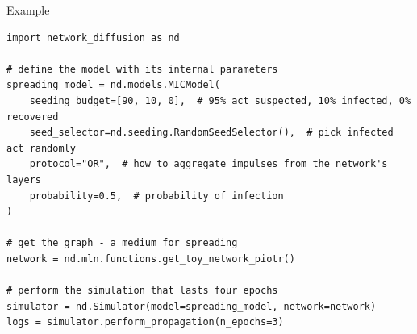 \documentclass[final]{beamer}
\newlength{\colwidth}
\begin{document}
\begin{frame}[t, fragile]
\begin{columns}[t]
\begin{column}{\colwidth}
\begin{alertblock}{Example}





\begin{lstlisting}[style=py, basicstyle=\footnotesize\ttfamily]
import network_diffusion as nd

# define the model with its internal parameters
spreading_model = nd.models.MICModel(
    seeding_budget=[90, 10, 0],  # 95% act suspected, 10% infected, 0% recovered
    seed_selector=nd.seeding.RandomSeedSelector(),  # pick infected act randomly
    protocol="OR",  # how to aggregate impulses from the network's layers
    probability=0.5,  # probability of infection
)

# get the graph - a medium for spreading
network = nd.mln.functions.get_toy_network_piotr()

# perform the simulation that lasts four epochs
simulator = nd.Simulator(model=spreading_model, network=network)
logs = simulator.perform_propagation(n_epochs=3)


\end{lstlisting}
\end{alertblock}
\end{column}
\end{columns}
\end{frame}
\end{document}
